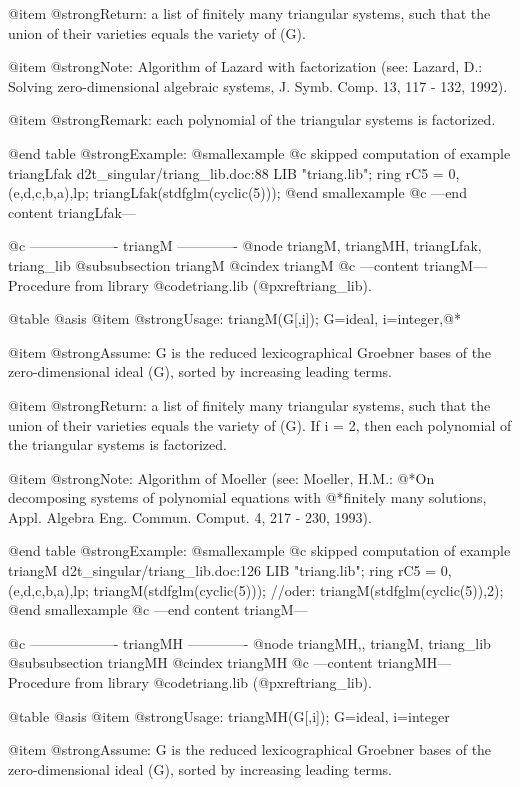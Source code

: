 @item @strong{Return:}
a list of finitely many triangular systems, such that
the union of their varieties equals the variety of (G).

@item @strong{Note:}
Algorithm of Lazard with factorization (see: Lazard, D.: Solving
zero-dimensional algebraic systems, J. Symb. Comp. 13, 117 - 132, 1992).

@item @strong{Remark:}
each polynomial of the triangular systems is factorized.

@end table
@strong{Example:}
@smallexample
@c skipped computation of example triangLfak d2t_singular/triang_lib.doc:88 
LIB "triang.lib";
ring rC5 = 0,(e,d,c,b,a),lp;
triangLfak(stdfglm(cyclic(5)));
@end smallexample
@c ---end content triangLfak---

@c ------------------- triangM -------------
@node triangM, triangMH, triangLfak, triang_lib
@subsubsection triangM
@cindex triangM
@c ---content triangM---
Procedure from library @code{triang.lib} (@pxref{triang_lib}).

@table @asis
@item @strong{Usage:}
triangM(G[,i]); G=ideal, i=integer,@*

@item @strong{Assume:}
G is the reduced lexicographical Groebner bases of the
zero-dimensional ideal (G), sorted by increasing leading terms.

@item @strong{Return:}
a list of finitely many triangular systems, such that
the union of their varieties equals the variety of (G).
If i = 2, then each polynomial of the triangular systems
is factorized.

@item @strong{Note:}
Algorithm of Moeller (see: Moeller, H.M.:
@*On decomposing systems of polynomial equations with
@*finitely many solutions, Appl. Algebra Eng. Commun. Comput. 4,
217 - 230, 1993).

@end table
@strong{Example:}
@smallexample
@c skipped computation of example triangM d2t_singular/triang_lib.doc:126 
LIB "triang.lib";
ring rC5 = 0,(e,d,c,b,a),lp;
triangM(stdfglm(cyclic(5))); //oder: triangM(stdfglm(cyclic(5)),2);
@end smallexample
@c ---end content triangM---

@c ------------------- triangMH -------------
@node triangMH,, triangM, triang_lib
@subsubsection triangMH
@cindex triangMH
@c ---content triangMH---
Procedure from library @code{triang.lib} (@pxref{triang_lib}).

@table @asis
@item @strong{Usage:}
triangMH(G[,i]); G=ideal, i=integer

@item @strong{Assume:}
G is the reduced lexicographical Groebner bases of the
zero-dimensional ideal (G), sorted by increasing leading terms.

